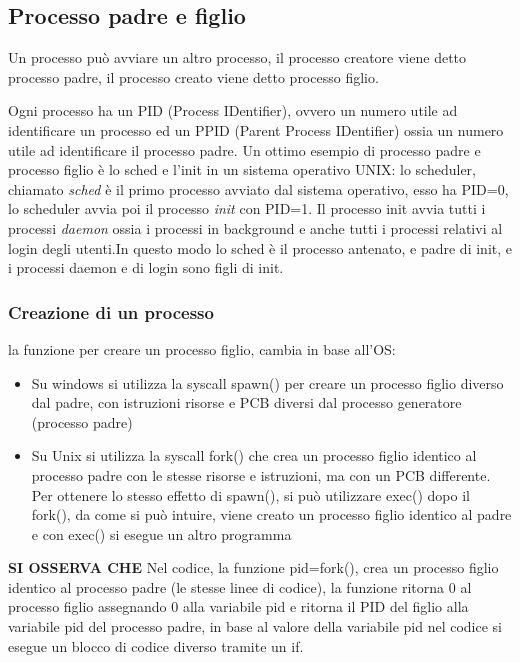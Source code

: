 \documentclass{article}
\begin{document}
    \subsection{Processo padre e figlio}
        \begin{tcolorbox}[colback= green!10!white, colframe=green!40!black, title= Processo padre e processo figlio]
            Un processo può avviare un altro processo, il processo creatore viene detto processo padre, il processo creato viene detto processo figlio.
        \end{tcolorbox}
        Ogni processo ha un PID (Process IDentifier), ovvero un numero utile ad identificare un processo ed un PPID (Parent Process IDentifier) ossia un numero utile ad identificare il processo padre. Un ottimo esempio di processo padre e processo figlio è lo sched e l'init in un sistema operativo UNIX: lo scheduler, chiamato \textit{sched} è il primo processo avviato dal sistema operativo, esso ha PID=0, lo scheduler avvia poi il processo \textit{init} con PID=1. Il processo init avvia tutti i processi \textit{daemon} ossia i processi in background e anche tutti i processi relativi al login degli utenti.In questo modo lo sched è il processo antenato, e padre di init, e i processi daemon e di login sono figli di init.

        \subsubsection{Creazione di un processo}

            \begin{tcolorbox}[colback= green!10!white, colframe=green!40!black, title= fork() e spawn()]
                la funzione per creare un processo figlio, cambia in base all'OS:

                \begin{itemize}
                    
                    \item Su windows si utilizza la syscall spawn() per creare un processo figlio diverso dal padre, con istruzioni risorse e PCB diversi dal processo generatore (processo padre)
                    
                    \item Su Unix si utilizza la syscall fork() che crea un processo figlio identico al processo padre con le stesse risorse e istruzioni, ma con un PCB differente. Per ottenere lo stesso effetto di spawn(), si può utilizzare exec() dopo il fork(), da come si può intuire, viene creato un processo figlio identico al padre e con exec() si esegue un altro programma
                \end{itemize}
            \end{tcolorbox}
            \textbf{SI OSSERVA CHE}
            Nel codice, la funzione pid=fork(), crea un processo figlio identico al processo padre (le stesse linee di codice), la funzione ritorna 0 al processo figlio assegnando 0 alla variabile pid e ritorna il PID del figlio alla variabile pid del processo padre, in base al valore della variabile pid nel codice si esegue un blocco di codice diverso tramite un if.
\end{document}
